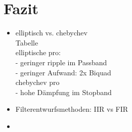 \section{Fazit}


\begin{itemize}
	\item elliptisch vs. chebychev\\
	Tabelle\\
elliptische pro:\\
- geringer ripple im Passband\\
- geringer Aufwand: 2x Biquad\\
chebychev pro\\
- hohe Dämpfung im Stopband
	\item Filterentwurfsmethoden: IIR vs FIR
	\item 
\end{itemize}